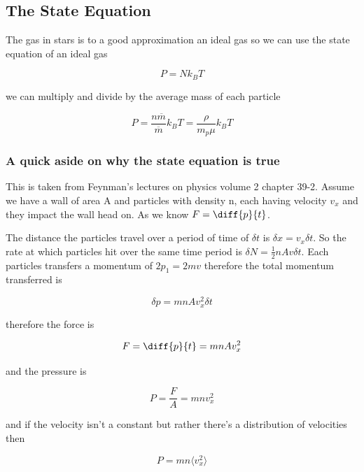 \subsection{The State Equation}

The gas in stars is to a good approximation an ideal gas so we can use the state equation of an ideal gas

\begin{equation}
	P = Nk_BT
\end{equation}

we can multiply and divide by the average mass of each particle 

\begin{equation}
	P = \frac{n\overline{m}}{\overline{m}}k_BT = \frac{\rho}{m_p\mu}k_BT
\end{equation}

\subsubsection{A quick aside on why the state equation is true}

This is taken from Feynman's lectures on physics volume 2 chapter 39-2. Assume we have a wall of area A and particles with density n, each having velocity $v_x$ and they impact the wall head on. As we know $F=\diff{p}{t}$.

The distance the particles travel over a period of time of $\delta t$ is $\delta x = v_x\delta t$. So the rate at which particles hit over the same time period is $\delta N = \frac{1}{2}nAv\delta t$. Each particles transfers a momentum of $2p_1=2mv$ therefore the total momentum transferred is

\begin{equation}
	\delta p = mnAv_x^2\delta t
\end{equation}

therefore the force is 

\begin{equation}
	F = \diff{p}{t} = mnAv_x^2
\end{equation}

and the pressure is

\begin{equation}
	P=\frac{F}{A}=mnv_x^2
\end{equation}

and if the velocity isn't a constant but rather there's a distribution of velocities then

\begin{equation}
	P=mn\langle v_x^2\rangle
\end{equation}

